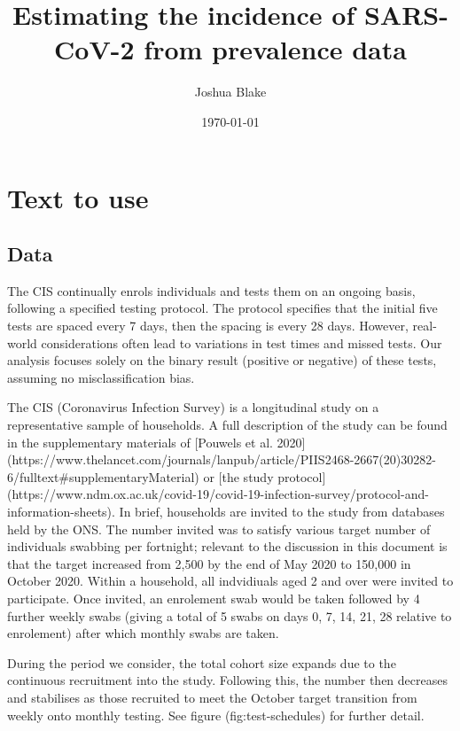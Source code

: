 \documentclass[a4paper]{report}
\title{Estimating the incidence of SARS-CoV-2 from prevalence data}
\author{Joshua Blake}
\date{\today}
\begin{document}
\maketitle

\chapter{Text to use}

\section{Data}
The CIS continually enrols individuals and tests them on an ongoing basis, following a
specified testing protocol. The protocol specifies that the initial five
tests are spaced every 7 days, then the spacing is every 28 days.
However, real-world considerations often lead to variations in test
times and missed tests. Our analysis focuses solely on the binary result
(positive or negative) of these tests, assuming no misclassification
bias.

The CIS (Coronavirus Infection Survey) is a longitudinal study on a representative sample of households.
A full description of the study can be found in the supplementary materials of [Pouwels et al. 2020](https://www.thelancet.com/journals/lanpub/article/PIIS2468-2667(20)30282-6/fulltext#supplementaryMaterial) or [the study protocol](https://www.ndm.ox.ac.uk/covid-19/covid-19-infection-survey/protocol-and-information-sheets).
In brief, households are invited to the study from databases held by the ONS.
The number invited was to satisfy various target number of individuals swabbing per fortnight; relevant to the discussion in this document is that the target increased from 2,500 by the end of May 2020 to 150,000 in October 2020.
Within a household, all indvidiuals aged 2 and over were invited to participate.
Once invited, an enrolement swab would be taken followed by 4 further weekly swabs (giving a total of 5 swabs on days 0, 7, 14, 21, 28 relative to enrolement) after which monthly swabs are taken.

During the period we consider, the total cohort size expands due to the continuous recruitment into the study.
Following this, the number then decreases and stabilises as those recruited to meet the October target transition from weekly onto monthly testing.
See figure \@ref(fig:test-schedules) for further detail.

\end{document}
